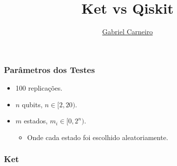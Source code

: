 \documentclass[12pt]{beamer}
\title{Ket vs Qiskit}
\author{\href{https://github.com/G-Carneiro}{Gabriel Carneiro}}
\begin{document}
    \begin{frame}[plain]
        \titlepage
    \end{frame}

    \begin{frame}
        \frametitle{Parâmetros dos Testes}
        \begin{itemize}
            \item 100 replicações.
            \item $n$ qubits, $n \in [2, 20)$.
            \item $m$ estados, $m_i \in [0, 2^n)$.
            \begin{itemize}
                \item Onde cada estado foi escolhido aleatoriamente.
            \end{itemize}
        \end{itemize}
    \end{frame}
    \begin{frame}
        \frametitle{Ket}
        \begin{figure}
            \label{fig:figure}
        \end{figure}
    \end{frame}
\end{document}
